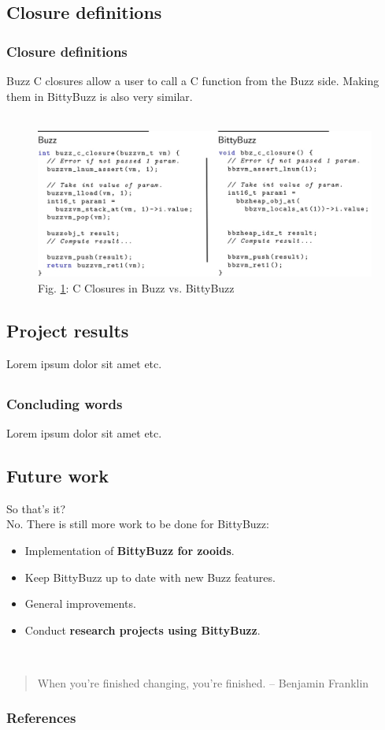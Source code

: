 \documentclass{beamer}
\begin{document}
	\begin{frame}
		\subsection{Closure definitions}
		\frametitle{Closure definitions}
		Buzz C closures allow a user to call a C function from the Buzz side. Making them in BittyBuzz is also very similar.\\
		~\\
		\begin{figure}
			\includegraphics[width=1\textwidth]{ClosureDefinitions}
			\caption{\label{figure:C Closures}Fig. \ref{figure:C Closures}: C Closures in Buzz vs. BittyBuzz}
		\end{figure}
	\end{frame}
	\begin{frame}
		\section{Project results}
		Lorem ipsum dolor sit amet etc.
	\end{frame}
	\begin{frame}
		\section{}
		\frametitle{Concluding words}
		Lorem ipsum dolor sit amet etc.
	\end{frame}
	\begin{frame}
		\section{Future work}
		So that's it?\\
		No. There is still more work to be done for BittyBuzz:
		\begin{itemize}
			\item Implementation of \textbf{BittyBuzz for zooids}.
			\item Keep BittyBuzz up to date with new Buzz features.
			\item General improvements.
			\item Conduct \textbf{research projects using BittyBuzz}.
		\end{itemize}
		~\\
		\begin{quote}
			When you're finished changing, you're finished. -- Benjamin Franklin
		\end{quote}
	\end{frame}
	\begin{frame}
		\frametitle[allowframebreaks]{References}
		
		
	\end{frame}
\end{document}

